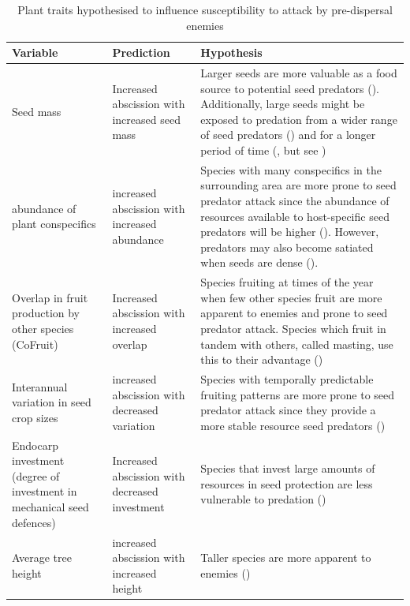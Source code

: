 \begin{table}
\small
\begin{tabular}{|p{4cm}p{4cm}p{13cm}|}
\hline
        \textbf{Variable} & \textbf{Prediction} & \textbf{Hypothesis} \\ \hline
        Seed mass & Increased abscission with increased seed mass & Larger seeds are more valuable as a food source to potential seed predators (\cite{moegenburgSabalPalmettoSeed1996, fennerRelationshipCapitulumSize2002}). Additionally, large seeds might be exposed to predation from a wider range of seed predators (\cite{greigPredispersalSeedPredation1993, mucunguziBruchidsSurvivalAcacia1995}) and for a longer period of time (\cite{molesLatitudeSeedPredation2003}, but see \cite {molesSmallseededSpeciesHave2003}) \\ \hline
        abundance of plant conspecifics & increased abscission with increased abundance & Species with many conspecifics in the surrounding area are more prone to seed predator attack since the abundance of resources available to host-specific seed predators will be higher (\cite{janzenHostPlantsIslands1968}). However, predators may also become satiated when seeds are dense (\cite{burkeyTropicalTreeSpecies1994}). \\ \hline
        Overlap in fruit production by other species (CoFruit) & Increased abscission with increased overlap & Species fruiting at times of the year when few other species fruit are more apparent to enemies and prone to seed predator attack. Species which fruit in tandem with others, called masting, use this to their advantage (\cite{toyInterspecificFloweringPatterns1991, toyFruitingPhenologySurvival1992, kellyEvolutionaryEcologyMast1994}) \\ \hline
        Interannual variation in seed crop sizes & increased abscission with decreased variation & Species with temporally predictable fruiting patterns are more prone to seed predator attack since they provide a more stable resource seed predators (\cite{janzenSeedPredationAnimals1971,janzenWhyBamboosWait1976}) \\ \hline
        Endocarp investment (degree of investment in mechanical seed defences) & Increased abscission with decreased investment & Species that invest large amounts of resources in seed protection are less vulnerable to predation (\cite{benkmanImpactTreeSquirrels1995, rodgersonMechanicalDefenseSeeds1998,gathuaEffectsPrimatesSquirrels2000,kuprewiczMammalInsectPredation2010}) \\ \hline
        Average tree height & increased abscission with increased height & Taller species are more apparent to enemies (\cite{gripenbergHighlyResolvedFood2019, janzenHostPlantsIslands1968}) \\ \hline

\end{tabular}
\caption{Plant traits hypothesised to influence susceptibility to attack by pre-dispersal enemies}
\label{tab:traits}
\end{table}


